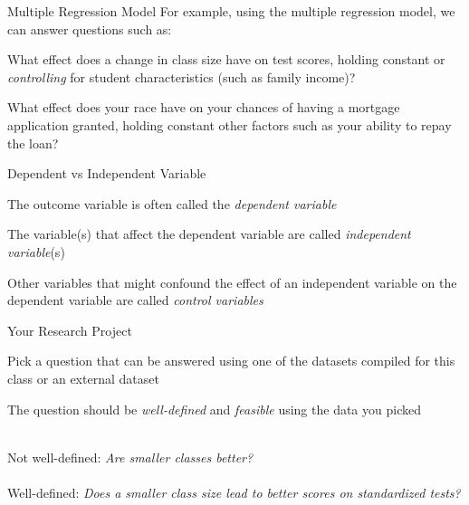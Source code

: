 \documentclass{./../div_teaching_slides}
\begin{document}
\begin{frame}{Multiple Regression Model}
 For example, using the multiple regression model, we can answer questions such as: \\ \vspace{0.5em}
\begin{witemize}
\item[] What effect does a change in class size have on test
scores, holding constant or \textit{controlling} for student characteristics (such as family
income)? 
\item[] What effect does your race have on your chances of having a mortgage application granted, holding constant other factors such as your ability to repay the loan?
\end{witemize}
\end{frame}


\begin{frame}{Dependent vs Independent Variable}
\begin{witemize}
  \item The outcome variable is often called the \textit{dependent variable}
  \item The variable(s) that affect the dependent variable are called \textit{independent variable}(s)
  \item Other variables that might confound the effect of an independent variable on the dependent variable are called \textit{control variables}
\end{witemize}
\end{frame}


\begin{frame}{Your Research Project}
\begin{witemize}
\item Pick a question that can be answered using one of the datasets compiled for this class or an external dataset
\item The question should be \textit{well-defined} and \textit{feasible} using the data you picked \\~\\ 
\end{witemize}
Not well-defined: \textit{Are smaller classes better?} \\~\\
Well-defined: \textit{Does a smaller class size lead to better scores on standardized tests?}
\end{frame}
\end{document}
